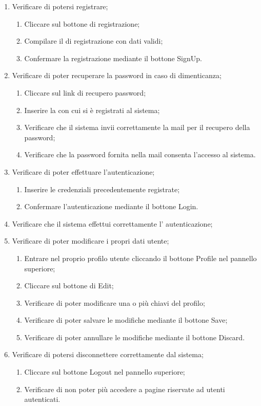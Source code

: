 \begin{enumerate}
\item Verificare di potersi registrare;
\begin{enumerate}
\item Cliccare sul bottone di registrazione;
\item Compilare il  di registrazione con dati validi;
\item Confermare la registrazione mediante il bottone SignUp.
\end{enumerate}
\item Verificare di poter recuperare la password in caso di dimenticanza;
\begin{enumerate}
\item Cliccare sul link di recupero password;
\item Inserire la  con cui si è registrati al sistema;
\item Verificare che il sistema invii correttamente la mail per il recupero della password;
\item Verificare che la password fornita nella mail consenta l'accesso al sistema.
\end{enumerate}
\item Verificare di poter effettuare l'autenticazione;
\begin{enumerate}
\item Inserire le credenziali precedentemente registrate;
\item Confermare l'autenticazione mediante il bottone Login.
\end{enumerate}
\item Verificare che il sistema effettui correttamente l' autenticazione;
\item Verificare di poter modificare i propri dati utente;
\begin{enumerate}
\item Entrare nel proprio profilo utente cliccando il bottone Profile nel pannello superiore;
\item Cliccare sul bottone di Edit;
\item Verificare di poter modificare una o più chiavi del profilo;
\item Verificare di poter salvare le modifiche mediante il bottone Save;
\item Verificare di poter annullare le modifiche mediante il bottone Discard.
\end{enumerate}
\item Verificare di potersi disconnettere correttamente dal sistema;
\begin{enumerate}
\item Cliccare sul bottone Logout nel pannello superiore;
\item Verificare di non poter più accedere a pagine riservate ad utenti autenticati.
\end{enumerate}
\end{enumerate}

